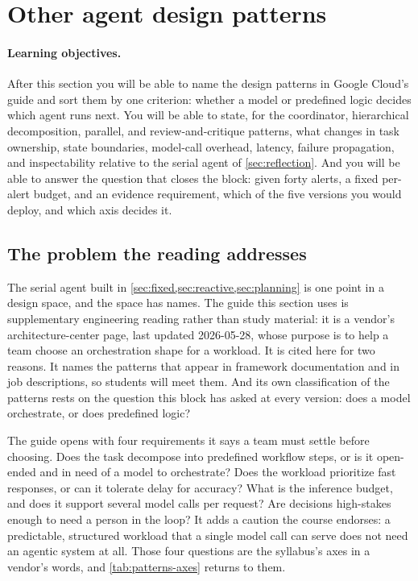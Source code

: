 \section{Other agent design patterns}
\label{sec:patterns}
\paragraph{Learning objectives.}
After this section you will be able to name the design patterns in Google Cloud's guide
\citep{google2026patterns} and sort them by one criterion: whether a model or predefined
logic decides which agent runs next. You will be able to state, for the coordinator,
hierarchical decomposition, parallel, and review-and-critique patterns, what changes in
task ownership, state boundaries, model-call overhead, latency, failure propagation, and
inspectability relative to the serial agent of \cref{sec:reflection}. And you will be able
to answer the question that closes the block: given forty alerts, a fixed per-alert budget,
and an evidence requirement, which of the five versions you would deploy, and which axis decides it.

\subsection{The problem the reading addresses}

The serial agent built in \cref{sec:fixed,sec:reactive,sec:planning}
is one point in a design space, and the space has names. The guide this section uses is
supplementary engineering reading rather than study material: it is a vendor's
architecture-center page, last updated 2026-05-28, whose purpose is to help a team choose
an orchestration shape for a workload. It is cited here for two reasons. It names the
patterns that appear in framework documentation and in job descriptions, so students will
meet them. And its own classification of the patterns rests on the question this block has
asked at every version: does a model orchestrate, or does predefined logic?

The guide opens with four requirements it says a team must settle before choosing. Does the
task decompose into predefined workflow steps, or is it open-ended and in need of a model to
orchestrate? Does the workload prioritize fast responses, or can it tolerate delay for
accuracy? What is the inference budget, and does it support several model calls per
request? Are decisions high-stakes enough to need a person in the loop? It
adds a caution the course endorses: a predictable, structured workload that a single model
call can serve does not need an agentic system at all. Those four questions are the
syllabus's axes in a vendor's words, and \cref{tab:patterns-axes} returns to them.

